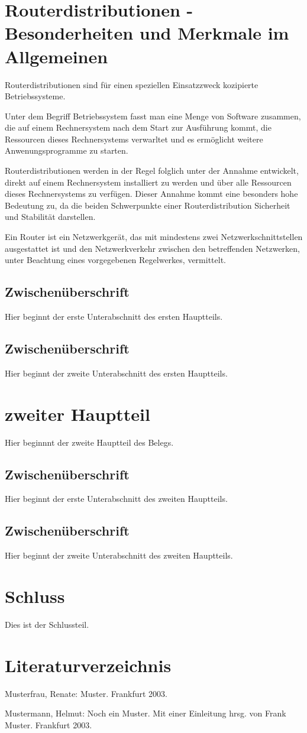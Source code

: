 \documentclass[a4paper,12pt]{scrartcl}
\begin{document}
\section{Routerdistributionen - Besonderheiten und Merkmale im Allgemeinen}
Routerdistributionen sind für einen speziellen Einsatzzweck kozipierte Betriebssysteme. 

Unter dem Begriff Betriebssystem fasst man eine Menge von Software zusammen, die auf einem Rechnersystem nach dem Start zur Ausführung kommt, die Ressourcen dieses Rechnersystems verwarltet und es ermöglicht weitere Anwenungsprogramme zu starten.

Routerdistributionen werden in der Regel folglich unter der Annahme entwickelt, direkt auf einem Rechnersystem installiert zu werden und über alle Ressourcen dieses Rechnersystems zu verfügen. Dieser Annahme kommt eine besonders hohe Bedeutung zu, da die beiden Schwerpunkte einer Routerdistribution Sicherheit und Stabilität darstellen. 

Ein Router ist ein Netzwerkgerät, das mit mindestens zwei Netzwerkschnittstellen ausgestattet ist und den Netzwerkverkehr zwischen den betreffenden Netzwerken, unter Beachtung eines vorgegebenen Regelwerkes, vermittelt.


\subsection{Zwischenüberschrift}
Hier beginnt der erste Unterabschnitt des ersten Hauptteils.

\subsection{Zwischenüberschrift}
Hier beginnt der zweite Unterabschnitt des ersten Hauptteils.

\section{zweiter Hauptteil}
Hier beginnnt der zweite Hauptteil des Belegs.

\subsection{Zwischenüberschrift}
Hier beginnt der erste Unterabschnitt des zweiten Hauptteils.

\subsection{Zwischenüberschrift}
Hier beginnt der zweite Unterabschnitt des zweiten Hauptteils.


\section{Schluss}
Dies ist der Schlussteil.
\clearpage

\section{Literaturverzeichnis}

Musterfrau, Renate: Muster. Frankfurt 2003.


Mustermann, Helmut: Noch ein Muster. Mit einer Einleitung hrsg. von Frank Muster. Frankfurt 2003.
\end{document}
